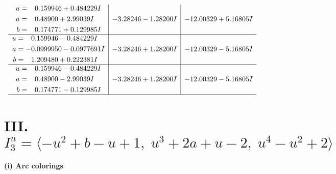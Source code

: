 \documentclass[1p]{elsarticle_modified}
\theoremstyle{definition}
\begin{document}
$$\begin{array}{c|c|c}
\begin{aligned}
u &= \phantom{-}0.159946 + 0.484229 I \\
a &= \phantom{-}0.48900 + 2.99039 I \\
b &= \phantom{-}0.174771 + 0.129985 I\end{aligned}
 & -3.28246 - 1.28200 I & -12.00329 + 5.16805 I \\ \hline\begin{aligned}
u &= \phantom{-}0.159946 - 0.484229 I \\
a &= -0.0999950 - 0.0977691 I \\
b &= \phantom{-}1.209480 + 0.222381 I\end{aligned}
 & -3.28246 + 1.28200 I & -12.00329 - 5.16805 I \\ \hline\begin{aligned}
u &= \phantom{-}0.159946 - 0.484229 I \\
a &= \phantom{-}0.48900 - 2.99039 I \\
b &= \phantom{-}0.174771 - 0.129985 I\end{aligned}
 & -3.28246 + 1.28200 I & -12.00329 - 5.16805 I\\
 \hline 
 \end{array}$$\newpage\newpage\renewcommand{\arraystretch}{1}
\centering \section*{III. $I^u_{3}= \langle - u^2+b- u+1,\;u^3+2 a+u-2,\;u^4- u^2+2 \rangle$}
\flushleft \textbf{(i) Arc colorings}\\
\end{document}
